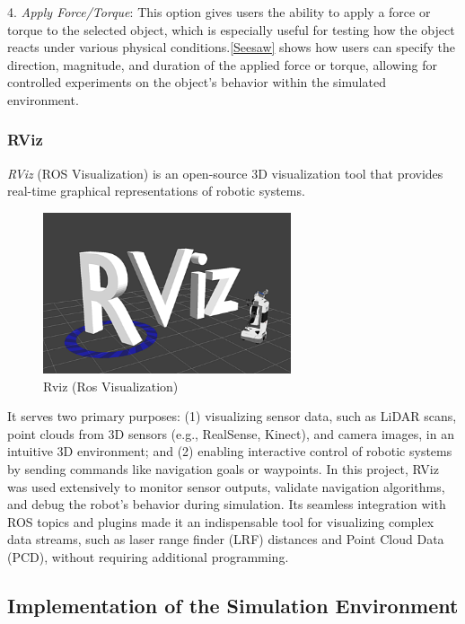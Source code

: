 \documentclass[../../main]{subfiles}
\begin{document}
4. \emph{Apply Force/Torque}: This option gives users the ability to apply a force or 
torque to the selected object, which is especially useful for testing how the object reacts 
under various physical conditions.\cref{Seesaw} shows how users can specify the direction, magnitude, and duration 
of the applied force or torque, allowing for controlled experiments on the object’s behavior 
within the simulated environment.
\newpage
\subsubsection{RViz}
\emph{RViz} (ROS Visualization) is an open-source 3D visualization tool that provides real-time graphical representations of robotic systems. 

\begin{figure}[H]
    \centering
\includegraphics[width=0.65\textwidth]{fig/rviz_logo.png}
\caption{Rviz (Ros Visualization)}
\label{Rviz Logo} %
\end{figure}

It serves two primary purposes: (1) visualizing sensor data, such as LiDAR scans, point clouds from 3D sensors (e.g., RealSense, Kinect), 
and camera images, in an intuitive 3D environment; and (2) enabling interactive control of robotic systems by sending commands 
like navigation goals or waypoints. In this project, RViz was used extensively to monitor sensor outputs, validate navigation algorithms, 
and debug the robot’s behavior during simulation. Its seamless integration with ROS topics and plugins made it an indispensable tool for 
visualizing complex data streams, such as laser range finder (LRF) distances and Point Cloud Data (PCD), without requiring additional programming.  
\newpage
\subsection{Implementation of the Simulation Environment}
\end{document}
